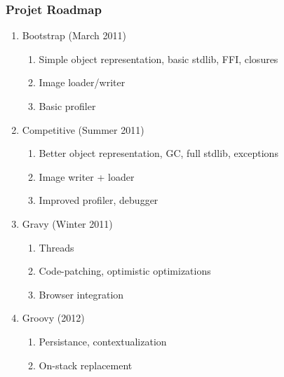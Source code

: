 \begin{frame}
\frametitle{\bf Projet Roadmap}
    \begin{enumerate}[1.]
        \item Bootstrap (March 2011)
        \begin{enumerate}[1.]
            \item Simple object representation, basic stdlib, FFI, closures
            \item Image loader/writer
            \item Basic profiler
        \end{enumerate}

        \item Competitive (Summer 2011)
        \begin{enumerate}[1.]
            \item Better object representation, GC, full stdlib, exceptions
            \item Image writer + loader
            \item Improved profiler, debugger
        \end{enumerate}

        \item Gravy (Winter 2011)
        \begin{enumerate}[1.]
            \item Threads 
            \item Code-patching, optimistic optimizations
            \item Browser integration
        \end{enumerate}

        \item Groovy (2012)
        \begin{enumerate}[1.]
            \item Persistance, contextualization
            \item On-stack replacement
        \end{enumerate}
    \end{enumerate}
\end{frame}
